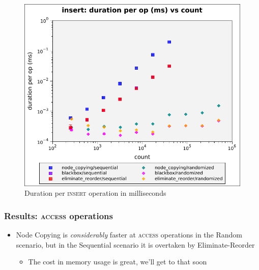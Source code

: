 \documentclass{beamer}
\begin{document}
\begin{frame}
\begin{figure}
  \center
  \includegraphics[height=0.65\textheight]{figures/graphs/insert-duration-per-op-vs-count.pdf}
  \caption{Duration per \textsc{insert} operation in milliseconds}
\end{figure}
\end{frame}

\begin{frame}
\frametitle{Results: \textsc{access} operations}
\begin{itemize}

  \item Node Copying is \textit{considerably} faster at \textsc{access}
  operations in the Random scenario, but in the Sequential scenario it is
  overtaken by Eliminate-Reorder

  \begin{itemize}
    \item The cost in memory usage is great, we'll get to that soon
  \end{itemize}

\end{itemize}
\end{frame}
\end{document}
